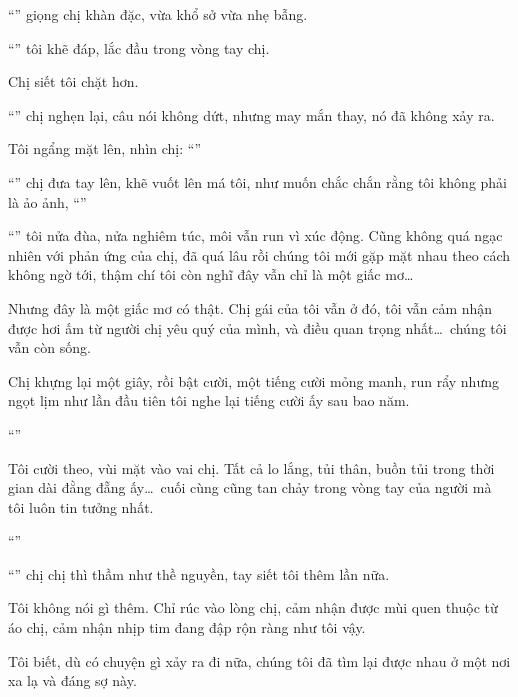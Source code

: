 \documentclass[../main.tex]{subfiles}
\begin{document}
``'' giọng chị khàn đặc, vừa khổ sở vừa nhẹ bẫng.

``'' tôi khẽ đáp, lắc đầu trong vòng tay chị.

Chị siết tôi chặt hơn.

``'' chị nghẹn lại, câu nói không dứt, nhưng may mắn thay, nó đã không xảy ra.

Tôi ngẩng mặt lên, nhìn chị: ``''

``'' chị đưa tay lên, khẽ vuốt lên má tôi, như muốn chắc chắn rằng tôi không phải là ảo ảnh, ``''

``'' tôi nửa đùa, nửa nghiêm túc, môi vẫn run vì xúc động. Cũng không quá ngạc nhiên với phản ứng của chị, đã quá lâu rồi chúng tôi mới gặp mặt nhau theo cách không ngờ tới, thậm chí tôi còn nghĩ đây vẫn chỉ là một giấc mơ\dots

Nhưng đây là một giấc mơ có thật. Chị gái của tôi vẫn ở đó, tôi vẫn cảm nhận được hơi ấm từ người chị yêu quý của mình, và điều quan trọng nhất\dots\ chúng tôi vẫn còn sống.

Chị khựng lại một giây, rồi bật cười, một tiếng cười mỏng manh, run rẩy nhưng ngọt lịm như lần đầu tiên tôi nghe lại tiếng cười ấy sau bao năm.

``''

Tôi cười theo, vùi mặt vào vai chị. Tất cả lo lắng, tủi thân, buồn tủi trong thời gian dài đằng đẵng ấy\dots\ cuối cùng cũng tan chảy trong vòng tay của người mà tôi luôn tin tưởng nhất.

``''

``'' chị chị thì thầm như thề nguyền, tay siết tôi thêm lần nữa.

Tôi không nói gì thêm. Chỉ rúc vào lòng chị, cảm nhận được mùi quen thuộc từ áo chị, cảm nhận nhịp tim đang đập rộn ràng như tôi vậy.

Tôi biết, dù có chuyện gì xảy ra đi nữa, chúng tôi đã tìm lại được nhau ở một nơi xa lạ và đáng sợ này.
\end{document}
